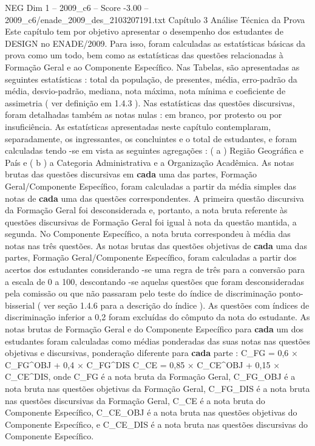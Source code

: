 \begin{textsample}{NEG Dim 1 – 2009\_c6 – Score -3.00 – 2009\_c6/enade\_2009\_des\_2103207191.txt}  \label{ex:f1_neg_220}
Capítulo 3 Análise Técnica da Prova Este capítulo tem por objetivo apresentar o desempenho dos estudantes de DESIGN no ENADE/2009.
Para isso, foram calculadas as estatísticas básicas da prova como um todo, bem como as estatísticas das questões relacionadas à Formação Geral e ao Componente Específico.
Nas Tabelas, são apresentadas as seguintes estatísticas : total da população, de presentes, média, erro-padrão da média, desvio-padrão, mediana, nota máxima, nota mínima e coeficiente de assimetria ( ver definição em 1.4.3 ).
Nas estatísticas das questões discursivas, foram detalhadas também as notas nulas : em branco, por protesto ou por insuficiência.
As estatísticas apresentadas neste capítulo contemplaram, separadamente, os ingressantes, os concluintes e o total de estudantes, e foram calculadas tendo -se em vista as seguintes agregações : ( a ) Região Geográfica e País e ( b ) a Categoria Administrativa e a Organização Acadêmica.
As notas brutas das questões discursivas em \textbf{cada} uma das partes, Formação Geral/Componente Específico, foram calculadas a partir da média simples das notas de \textbf{cada} uma das questões correspondentes.
A primeira questão discursiva da Formação Geral foi desconsiderada e, portanto, a nota bruta referente às questões discursivas de Formação Geral foi igual à nota da questão mantida, a segunda.
No Componente Específico, a nota bruta correspondeu à média das notas nas três questões.
As notas brutas das questões objetivas de \textbf{cada} uma das partes, Formação Geral/Componente Específico, foram calculadas a partir dos acertos dos estudantes considerando -se uma regra de três para a conversão para a escala de 0 a 100, descontando -se aquelas questões que foram desconsideradas pela comissão ou que não passaram pelo teste do índice de discriminação ponto-bisserial ( ver seção 1.4.6 para a descrição do índice ).
As questões com índices de discriminação inferior a 0,2 foram excluídas do cômputo da nota do estudante.
As notas brutas de Formação Geral e do Componente Específico para \textbf{cada} um dos estudantes foram calculadas como médias ponderadas das suas notas nas questões objetivas e discursivas, ponderação diferente para \textbf{cada} parte : C\_FG = 0,6 × C\_FG\textasciicircum{}OBJ + 0,4 × C\_FG\textasciicircum{}DIS C\_CE = 0,85 × C\_CE\textasciicircum{}OBJ + 0,15 × C\_CE\textasciicircum{}DIS, onde C\_FG é a nota bruta da Formação Geral, C\_FG\_OBJ é a nota bruta nas questões objetivas da Formação Geral, C\_FG\_DIS é a nota bruta nas questões discursivas da Formação Geral, C\_CE é a nota bruta do Componente Específico, C\_CE\_OBJ é a nota bruta nas questões objetivas do Componente Específico, e C\_CE\_DIS é a nota bruta nas questões discursivas do Componente Específico.

\end{textsample}

